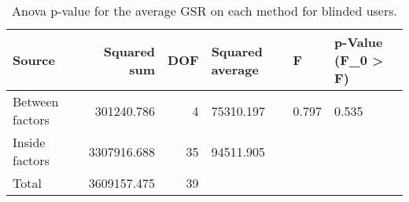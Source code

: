
\begin{table}[!htb]
\centering
\caption{Anova p-value for the average GSR on each method for blinded users.}
\label{tab:anova_gsr}
\begin{tabular}{lrrlll}
\toprule
         Source &  Squared sum &  DOF & Squared average &     F & p-Value (F\_0 > F) \\
\midrule
Between factors &   301240.786 &    4 &       75310.197 & 0.797 &             0.535 \\
 Inside factors &  3307916.688 &   35 &       94511.905 &       &                   \\
          Total &  3609157.475 &   39 &                 &       &                   \\
\bottomrule
\end{tabular}
\end{table}


